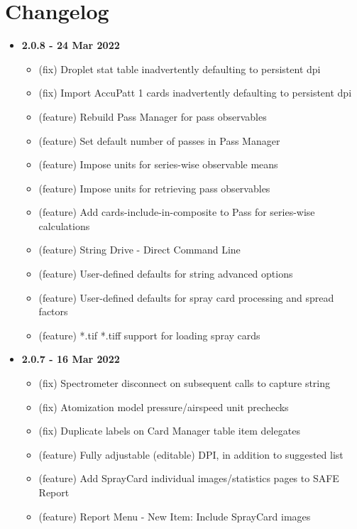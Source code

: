 \documentclass[10pt,letterpaper,titlepage]{article}
\begin{document}
    \section{Changelog}
    \begin{itemize}
        \item \textbf{2.0.8 - 24 Mar 2022}
        \begin{itemize}
            \item (fix) Droplet stat table inadvertently defaulting to persistent dpi
            \item (fix) Import AccuPatt 1 cards inadvertently defaulting to persistent dpi
            \item (feature) Rebuild Pass Manager for pass observables
            \item (feature) Set default number of passes in Pass Manager
            \item (feature) Impose units for series-wise observable means
            \item (feature) Impose units for retrieving pass observables
            \item (feature) Add cards-include-in-composite to Pass for series-wise calculations
            \item (feature) String Drive - Direct Command Line
            \item (feature) User-defined defaults for string advanced options
            \item (feature) User-defined defaults for spray card processing and spread factors
            \item (feature) *.tif *.tiff support for loading spray cards
        \end{itemize}
        \item \textbf{2.0.7 - 16 Mar 2022}
        \begin{itemize}
            \item (fix) Spectrometer disconnect on subsequent calls to capture string
            \item (fix) Atomization model pressure/airspeed unit prechecks
            \item (fix) Duplicate labels on Card Manager table item delegates
            \item (feature) Fully adjustable (editable) DPI, in addition to suggested list
            \item (feature) Add SprayCard individual images/statistics pages to SAFE Report
            \item (feature) Report Menu - New Item: Include SprayCard images

\end{itemize}
\end{itemize}
\end{document}
